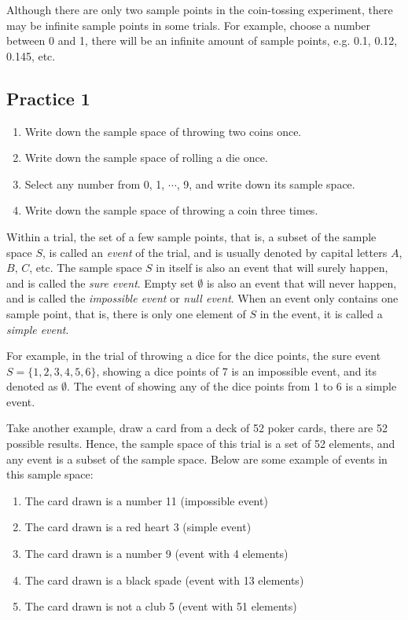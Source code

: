 \documentclass{report}
\begin{document}
\begin{multicols}{2}
  Although there are only two sample points in the coin-tossing experiment, there
  may be infinite sample points in some trials. For example, choose a number
  between 0 and 1, there will be an infinite amount of sample points, e.g. 0.1,
  0.12, 0.145, etc.

  \subsection{Practice 1}

  \begin{enumerate}
    \item Write down the sample space of throwing two coins once.

    \item Write down the sample space of rolling a die once.

    \item Select any number from 0, 1, $\cdots$, 9, and write down its sample space.

    \item Write down the sample space of throwing a coin three times.
  \end{enumerate}

  Within a trial, the set of a few sample points, that is, a subset of the sample
  space $S$, is called an \emph{event} of the trial, and is usually denoted by
  capital letters $A$, $B$, $C$, etc. The sample space $S$ in itself is also an
  event that will surely happen, and is called the \emph{sure event}. Empty set
  $\emptyset$ is also an event that will never happen, and is called the
  \emph{impossible event} or \emph{null event}. When an event only contains one
  sample point, that is, there is only one element of $S$ in the event, it is
  called a \emph{simple event}.

  For example, in the trial of throwing a dice for the dice points, the sure
  event $S = \{1, 2, 3, 4, 5, 6\}$, showing a dice points of 7 is an impossible
  event, and its denoted as $\emptyset$. The event of showing any of the dice
  points from 1 to 6 is a simple event.

  Take another example, draw a card from a deck of 52 poker cards, there are 52
  possible results. Hence, the sample space of this trial is a set of 52
  elements, and any event is a subset of the sample space. Below are some example
  of events in this sample space:

  \begin{enumerate}
    \item The card drawn is a number 11 (impossible event)
    \item The card drawn is a red heart 3 (simple event)
    \item The card drawn is a number 9 (event with 4 elements)
    \item The card drawn is a black spade (event with 13 elements)
    \item The card drawn is not a club 5 (event with 51 elements)
  \end{enumerate}


\end{multicols}
\end{document}
